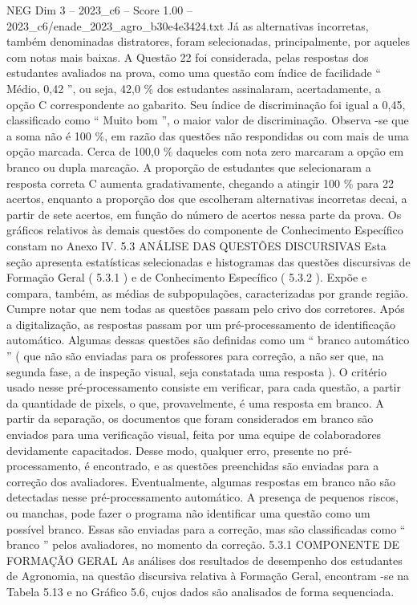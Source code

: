 \begin{textsample}{NEG Dim 3 – 2023\_c6 – Score 1.00 – 2023\_c6/enade\_2023\_agro\_b30e4e3424.txt}
Já as alternativas incorretas, também denominadas distratores, foram selecionadas, principalmente, por aqueles com notas mais baixas.
A Questão 22 foi considerada, pelas respostas dos estudantes avaliados na prova, como uma questão com índice de facilidade “ Médio, 0,42 ”, ou seja, 42,0 \% dos estudantes assinalaram, acertadamente, a opção C correspondente ao gabarito.
Seu índice de discriminação foi igual a 0,45, classificado como “ Muito bom ”, o maior valor de discriminação.
Observa -se que a soma não é 100 \%, em razão das questões não respondidas ou com mais de uma opção marcada.
Cerca de 100,0 \% daqueles com nota zero marcaram a opção em branco ou dupla marcação.
A proporção de estudantes que selecionaram a resposta correta C aumenta gradativamente, chegando a atingir 100 \% para 22 acertos, enquanto a proporção dos que escolheram alternativas incorretas decai, a partir de sete acertos, em função do número de acertos nessa parte da prova.
Os gráficos relativos às demais questões do componente de Conhecimento Específico constam no Anexo IV. 5.3 ANÁLISE DAS QUESTÕES DISCURSIVAS Esta seção apresenta estatísticas selecionadas e histogramas das questões discursivas de Formação Geral ( 5.3.1 ) e de Conhecimento Específico ( 5.3.2 ).
Expõe e compara, também, as médias de subpopulações, caracterizadas por grande região.
Cumpre notar que nem todas as questões passam pelo crivo dos corretores.
Após a digitalização, as respostas passam por um pré-processamento de identificação automático.
Algumas dessas questões são definidas como um “ branco automático ” ( que não são enviadas para os professores para correção, a não ser que, na segunda fase, a de inspeção visual, seja constatada uma resposta ).
O critério usado nesse pré-processamento consiste em verificar, para cada questão, a partir da quantidade de pixels, o que, provavelmente, é uma resposta em branco.
A partir da separação, os documentos que foram considerados em branco são enviados para uma verificação visual, feita por uma equipe de colaboradores devidamente capacitados.
Desse modo, qualquer erro, presente no pré-processamento, é encontrado, e as questões preenchidas são enviadas para a correção dos avaliadores.
Eventualmente, algumas respostas em branco não são detectadas nesse pré-processamento automático.
A presença de pequenos riscos, ou manchas, pode fazer o programa não identificar uma questão como um possível branco.
Essas são enviadas para a correção, mas são classificadas como “ branco ” pelos avaliadores, no momento da correção. 5.3.1 COMPONENTE DE FORMAÇÃO GERAL As análises dos resultados de desempenho dos estudantes de Agronomia, na questão discursiva relativa à Formação Geral, encontram -se na Tabela 5.13 e no Gráfico 5.6, cujos dados são analisados de forma sequenciada.

\end{textsample}
